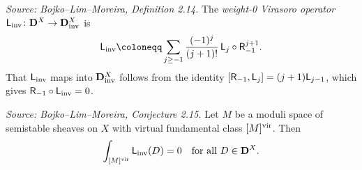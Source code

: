 \begin{definition}[WeightZeroVirasoroOp]
  \label{def:linv}
  \textit{Source: Bojko--Lim--Moreira, Definition 2.14.}
  The \emph{weight-0 Virasoro operator} \(\mathsf{L}_{\mathrm{inv}} \colon \mathbf{D}^X \to \mathbf{D}^X_{\mathrm{inv}}\) is
  \[\Linv \coloneqq \sum_{j \geq -1} \frac{(-1)^j}{(j+1)!}\, \bL_j \circ \bR_{-1}^{j+1}.\]
  That \(\mathsf{L}_{\mathrm{inv}}\) maps into \(\mathbf{D}^X_{\mathrm{inv}}\) follows from the identity
  \([\mathsf{R}_{-1}, \mathsf{L}_j] = (j+1)\mathsf{L}_{j-1}\), which gives \(\mathsf{R}_{-1} \circ \mathsf{L}_{\mathrm{inv}} = 0\).
\end{definition}


\begin{conjecture}[VirasoroConjectureSheavesInv]
  \label{conj:virasoro-sheaves-inv}
  \textit{Source: Bojko--Lim--Moreira, Conjecture 2.15.}
  Let \(M\) be a moduli space of semistable sheaves on \(X\) with virtual fundamental
  class \([M]^{\mathrm{vir}}\). Then
  \[\int_{[M]^{\mathrm{vir}}} \mathsf{L}_{\mathrm{inv}}(D) = 0 \quad \text{for all } D \in \mathbf{D}^X.\]
\end{conjecture}



